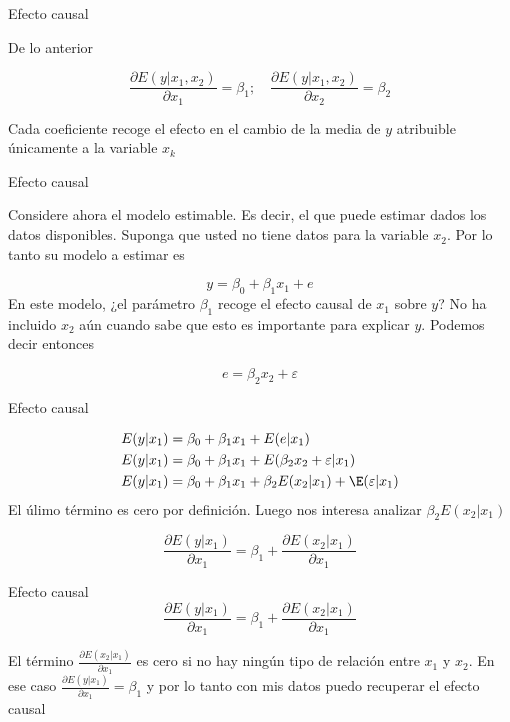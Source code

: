 \documentclass{beamer}
\begin{document}
\begin{frame}{Efecto causal}

De lo anterior

\begin{equation*}
    \dfrac{\partial E(y|x_1,x_2)}{\partial x_1}=\beta_1;  \quad \dfrac{\partial E(y|x_1,x_2)}{\partial x_2}=\beta_2
\end{equation*}

    Cada coeficiente recoge el efecto en el cambio de la media de $y$ atribuible únicamente a la variable $x_k$
\end{frame}

\begin{frame}{Efecto causal}

Considere ahora el modelo estimable. Es decir, el que puede estimar dados los datos disponibles. Suponga que usted no tiene datos para la variable $x_2$. Por lo tanto su modelo a estimar es

\begin{equation*}
    y=\beta_0+\beta_1x_1+e
\end{equation*}
    En este modelo, ¿el parámetro $\beta_1$ recoge el efecto causal de $x_1$ sobre $y$? No ha incluido $x_2$ aún cuando sabe que esto es importante para explicar $y$. Podemos decir entonces

    \begin{equation*}
        e=\beta_2x_2+\varepsilon
    \end{equation*}
\end{frame}

\begin{frame}{Efecto causal}

\begin{align*}
    E(y|x_1)&=\beta_0+\beta_1x_1+E(e|x_1)\\
    E(y|x_1)&=\beta_0+\beta_1x_1+E(\beta_2x_2+\varepsilon|x_1)\\
    E(y|x_1)&=\beta_0+\beta_1x_1+\beta_2E(x_2|x_1)+\E(\varepsilon|x_1)\\
\end{align*}
El úlimo término es cero por definición. Luego nos interesa analizar $\beta_2E(x_2|x_1)$

\begin{equation*}
    \dfrac{\partial E(y|x_1)}{\partial x_1}=\beta_1+\dfrac{\partial E(x_2|x_1)}{\partial x_1}
\end{equation*}
\end{frame}

\begin{frame}{Efecto causal}
    \begin{equation*}
    \dfrac{\partial E(y|x_1)}{\partial x_1}=\beta_1+\dfrac{\partial E(x_2|x_1)}{\partial x_1}
\end{equation*}

El término $\frac{\partial E(x_2|x_1)}{\partial x_1}$ es cero si no hay ningún tipo de relación entre $x_1$ y $x_2$. En ese caso $\frac{\partial E(y|x_1)}{\partial x_1}=\beta_1$ y por lo tanto con mis datos puedo recuperar el efecto causal
\end{frame}
\end{document}
